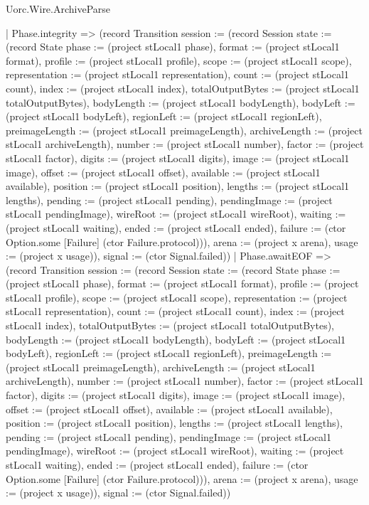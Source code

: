 \begin{lexlean}{Uorc.Wire.ArchiveParse}
\begin{semanticmodule}
{    | Phase.integrity => (record Transition {session := (record Session {state := (record State {phase := (project stLocal1 phase), format := (project stLocal1 format), profile := (project stLocal1 profile), scope := (project stLocal1 scope), representation := (project stLocal1 representation), count := (project stLocal1 count), index := (project stLocal1 index), totalOutputBytes := (project stLocal1 totalOutputBytes), bodyLength := (project stLocal1 bodyLength), bodyLeft := (project stLocal1 bodyLeft), regionLeft := (project stLocal1 regionLeft), preimageLength := (project stLocal1 preimageLength), archiveLength := (project stLocal1 archiveLength), number := (project stLocal1 number), factor := (project stLocal1 factor), digits := (project stLocal1 digits), image := (project stLocal1 image), offset := (project stLocal1 offset), available := (project stLocal1 available), position := (project stLocal1 position), lengths := (project stLocal1 lengths), pending := (project stLocal1 pending), pendingImage := (project stLocal1 pendingImage), wireRoot := (project stLocal1 wireRoot), waiting := (project stLocal1 waiting), ended := (project stLocal1 ended), failure := (ctor Option.some [Failure] (ctor Failure.protocol))}), arena := (project x arena), usage := (project x usage)}), signal := (ctor Signal.failed)})
    | Phase.awaitEOF => (record Transition {session := (record Session {state := (record State {phase := (project stLocal1 phase), format := (project stLocal1 format), profile := (project stLocal1 profile), scope := (project stLocal1 scope), representation := (project stLocal1 representation), count := (project stLocal1 count), index := (project stLocal1 index), totalOutputBytes := (project stLocal1 totalOutputBytes), bodyLength := (project stLocal1 bodyLength), bodyLeft := (project stLocal1 bodyLeft), regionLeft := (project stLocal1 regionLeft), preimageLength := (project stLocal1 preimageLength), archiveLength := (project stLocal1 archiveLength), number := (project stLocal1 number), factor := (project stLocal1 factor), digits := (project stLocal1 digits), image := (project stLocal1 image), offset := (project stLocal1 offset), available := (project stLocal1 available), position := (project stLocal1 position), lengths := (project stLocal1 lengths), pending := (project stLocal1 pending), pendingImage := (project stLocal1 pendingImage), wireRoot := (project stLocal1 wireRoot), waiting := (project stLocal1 waiting), ended := (project stLocal1 ended), failure := (ctor Option.some [Failure] (ctor Failure.protocol))}), arena := (project x arena), usage := (project x usage)}), signal := (ctor Signal.failed)})
}
\end{semanticmodule}
\end{lexlean}
